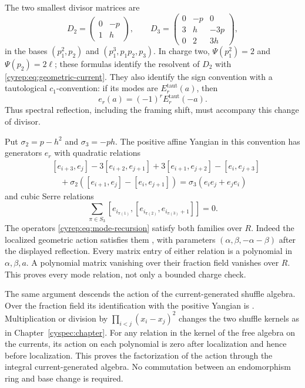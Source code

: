 The two smallest divisor matrices are
\begin{equation}\label{cyrep:eq:small-divisors}
 D_2=\begin{pmatrix}0&-p\\1&h\end{pmatrix},\qquad
 D_3=\begin{pmatrix}0&-p&0\\3&h&-3p\\0&2&3h\end{pmatrix},
\end{equation}
in the bases \((p_1^2,p_2)\) and \((p_1^3,p_1p_2,p_3)\).
In charge two, \(\Psi(p_1^2)=2\) and \(\Psi(p_2)=2\ell\);
these formulas identify the resolvent of \(D_2\) with
\eqref{cyrep:eq:geometric-current}.
They also identify the sign convention with a tautological
\(c_1\)-convention: if its modes are \(E_r^{\mathrm{taut}}(a)\), then
\[
 e_r(a)=(-1)^rE_r^{\mathrm{taut}}(-a).
\]
Thus spectral reflection, including the framing shift, must accompany
this change of divisor.

Put
\(\sigma_2=p-h^2\) and \(\sigma_3=-ph\).
The positive affine Yangian in this convention has generators \(e_r\)
with quadratic relations
\begin{equation}\label{cyrep:eq:quadratic}
\begin{split}
 &[e_{i+3},e_j]-3[e_{i+2},e_{j+1}]
 +3[e_{i+1},e_{j+2}]-[e_i,e_{j+3}]\\
 &\quad+\sigma_2([e_{i+1},e_j]-[e_i,e_{j+1}])
       =\sigma_3(e_ie_j+e_je_i)
\end{split}
\end{equation}
and cubic Serre relations
\begin{equation}\label{cyrep:eq:serre}
 \sum_{\pi\in S_3}
 [e_{i_{\pi(1)}},[e_{i_{\pi(2)}},e_{i_{\pi(3)}+1}]]=0.
\end{equation}
The operators \eqref{cyrep:eq:mode-recursion} satisfy both families
over \(R\). Indeed the localized geometric action satisfies them
\cite[Theorem 2.2]{Tsymbaliuk}, with parameters
\((\alpha,\beta,-\alpha-\beta)\) after the displayed reflection.
Every matrix entry of either relation is a polynomial in
\(\alpha,\beta,a\). A polynomial matrix vanishing over their
fraction field vanishes over \(R\).
This proves every mode relation, not only a bounded charge check.

The same argument descends the action of the current-generated
shuffle algebra. Over the fraction field its identification with
the positive Yangian is \cite[Theorem 7.6]{Tsymbaliuk}.
Multiplication or division by
\(\prod_{i<j}(x_i-x_j)^2\) changes the two shuffle kernels as in
Chapter~\ref{cyspec:chapter}.
For any relation in the kernel of the free algebra on the currents,
its action on each polynomial is zero after localization and hence
before localization. This proves the factorization of the action
through the integral current-generated algebra. No commutation
between an endomorphism ring and base change is required.

